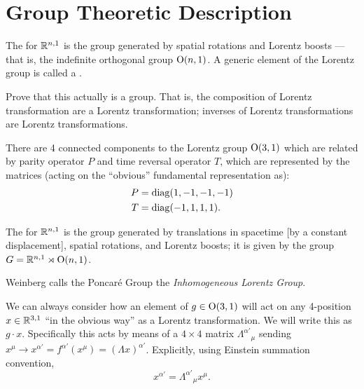 \section{Group Theoretic Description}

\begin{definition}
The  for $\mathbb{R}^{n,1}$ is the group
generated by spatial rotations and Lorentz boosts --- that is, the indefinite
orthogonal group $\mathrm{O}(n,1)$. A generic element of the Lorentz group is
called a .
\end{definition}

\begin{exercise}
Prove that this actually is a group. That is, the composition of Lorentz
transformation are a Lorentz transformation; inverses of Lorentz
transformations are Lorentz transformations.
\end{exercise}

\M
There are 4 connected components to the Lorentz group $\mathrm{O}(3,1)$ which
are related by parity operator $P$ and time reversal operator $T$, which
are represented by the matrices (acting on the ``obvious'' fundamental
representation as):
\begin{subequations}
\begin{align}
P &= \operatorname{diag}(1, -1, -1, -1)\\
T &= \operatorname{diag}(-1, 1, 1, 1).
\end{align}
\end{subequations}

\begin{definition}
The  for $\mathbb{R}^{n,1}$ is the group generated by
translations in spacetime [by a constant displacement], spatial
rotations, and Lorentz boosts; it is given by the group
$G = \mathbb{R}^{n,1}\rtimes\mathrm{O}(n,1)$.
\end{definition}

\begin{remark}
Weinberg calls the Poncar\'e Group the \emph{Inhomogeneous Lorentz Group}.
\end{remark}

\M
We can always consider how an element of $g\in\mathrm{O}(3,1)$ will act on any
4-position $x\in\mathbb{R}^{3,1}$ ``in the obvious way'' as a Lorentz
transformation. We will write this as $g\cdot x$. Specifically this acts
by means of a $4\times4$ matrix ${\Lambda^{\alpha'}}_{\mu}$ sending
$x^{\mu}\to x^{\alpha'} = f^{\alpha'}(x^{\mu}) = (\Lambda x)^{\alpha'}$.
Explicitly, using Einstein summation convention,
\begin{equation*}
x^{\alpha'} = {\Lambda^{\alpha'}}_{\mu}x^{\mu}.
\end{equation*}

